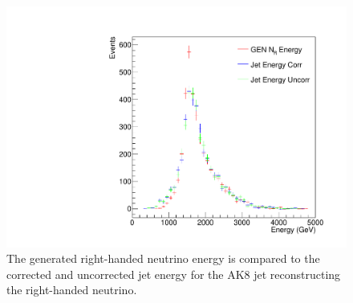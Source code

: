 \begin{figure}[!tp]
    \centering
    \includegraphics[width=\textwidth]{figures/JetEnergyVsNeutrinoEnergy_3000_400.pdf}
    \caption[
       Reconstructed Jet Energy vs Generated Neutrino Energy.
    ]{
        The generated right-handed neutrino energy is compared to the corrected and uncorrected jet energy for the AK8 jet reconstructing the right-handed neutrino. 
    }
    \label{fig:jetEvsNRE}
\end{figure}



